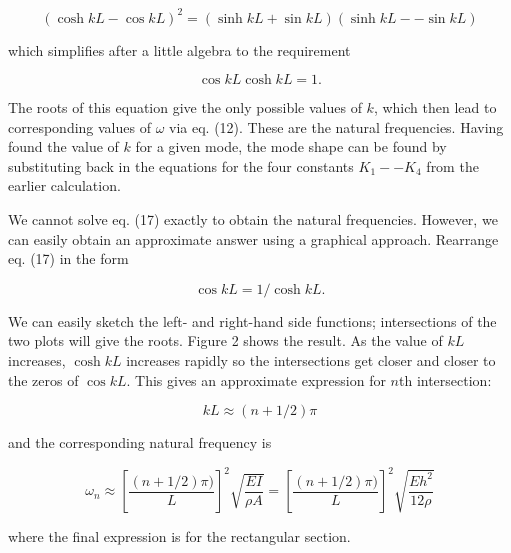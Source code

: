   \begin{equation*}(\cosh kL -\cos kL)^2 = (\sinh kL + \sin kL)(\sinh kL -- 
  \sin kL) \tag{16}\end{equation*} 

  \noindent{}which simplifies after a little algebra to the requirement 

  \begin{equation*}\cos kL \cosh kL =1. \tag{17}\end{equation*} 

  The roots of this equation give the only possible values of $k$, which then 
  lead to corresponding values of $\omega$ via eq. (12). These are the natural 
  frequencies. Having found the value of $k$ for a given mode, the mode shape 
  can be found by substituting back in the equations for the four constants 
  $K_1 -- K_4$ from the earlier calculation. 

  We cannot solve eq. (17) exactly to obtain the natural frequencies. However, 
  we can easily obtain an approximate answer using a graphical approach. 
  Rearrange eq. (17) in the form 

  \begin{equation*}\cos kL =1/\cosh kL. \tag{18}\end{equation*} 

  We can easily sketch the left- and right-hand side functions; intersections 
  of the two plots will give the roots. Figure 2 shows the result. As the value 
  of $kL$ increases, $\cosh kL$ increases rapidly so the intersections get 
  closer and closer to the zeros of $\cos kL$. This gives an approximate 
  expression for $n$th intersection: 

  \begin{equation*}kL \approx (n +1/2) \pi \tag{19}\end{equation*} 

  \noindent{}and the corresponding natural frequency is 

  \begin{equation*}\omega_n \approx \left[ \dfrac{(n+1/2)\pi)}{L}\right]^2 
  \sqrt{\dfrac{EI}{\rho A}} = \left[ \dfrac{(n+1/2)\pi)}{L}\right]^2 
  \sqrt{\dfrac{Eh^2}{12 \rho}} \tag{20}\end{equation*} 

  \noindent{}where the final expression is for the rectangular section. 

